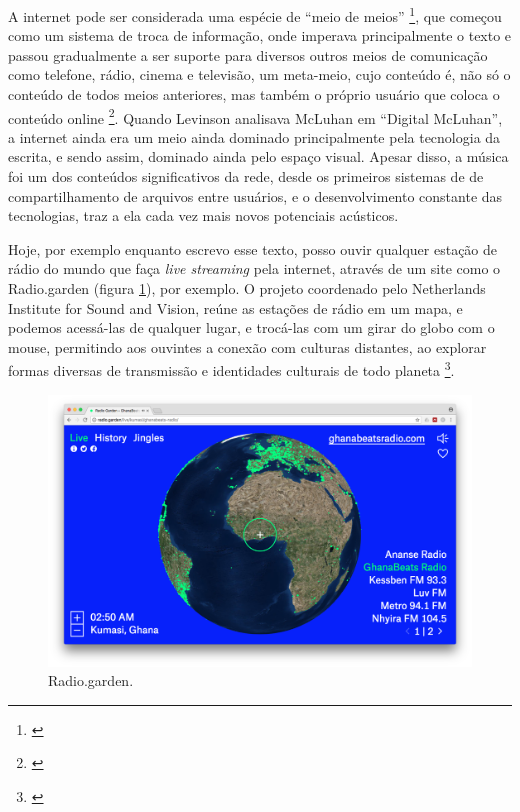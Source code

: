     A internet pode ser considerada uma espécie de ``meio de meios'' \footnote{\cite[5]{Levinson2001}}, que começou como um sistema de troca de informação, onde imperava principalmente o texto e passou gradualmente a ser suporte para diversos outros  meios de comunicação como telefone, rádio, cinema e televisão, um meta-meio, cujo conteúdo é, não só o conteúdo de todos meios anteriores, mas também o próprio usuário que coloca o conteúdo online \footnote{\cite[39]{Levinson2001}}. Quando Levinson analisava McLuhan em ``Digital McLuhan'', a internet ainda era um meio ainda dominado principalmente pela tecnologia da escrita, e sendo assim, dominado ainda pelo espaço visual. Apesar disso, a música foi um dos conteúdos significativos da rede, desde os primeiros sistemas de de compartilhamento de arquivos entre usuários, e o desenvolvimento constante das tecnologias, traz a ela cada vez mais novos potenciais acústicos.
    
Hoje, por exemplo enquanto escrevo esse texto, posso ouvir qualquer estação de rádio do mundo que faça \emph{live streaming} pela internet, através de um site como o Radio.garden (figura \ref{radiogarden}), por exemplo. O projeto coordenado pelo Netherlands Institute for Sound and Vision, reúne as estações de rádio em um mapa, e podemos acessá-las de qualquer lugar, e trocá-las com um girar do globo com o mouse, permitindo aos ouvintes a conexão com culturas distantes, ao explorar formas diversas de transmissão e identidades culturais de todo planeta \footnote{\cite{caroline2016radio}}. 

\begin{figure}[htb]
    \caption{\label{radiogarden} Radio.garden.}
    \begin{center}
        \includegraphics[width=1\linewidth]{pictures/radio_garden_2018-06-10.png}
    \end{center}
    
\end{figure}

